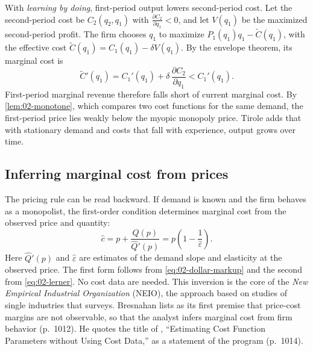 With \emph{learning by doing}, first-period output lowers second-period cost. Let the second-period cost be
$C_2(q_2, q_1)$ with $\frac{\partial C_2}{\partial q_1} < 0$, and let $V(q_1)$ be the maximized second-period profit.
The firm chooses $q_1$ to maximize $P_1(q_1)q_1 - \tilde C(q_1)$, with the effective cost $\tilde C(q_1) = C_1(q_1) -
\delta V(q_1)$. By the envelope theorem, its marginal cost is
\[
  \tilde C'(q_1) = C_1'(q_1) + \delta\,\frac{\partial C_2}{\partial q_1} < C_1'(q_1) .
\]
First-period marginal revenue therefore falls short of current marginal cost. By \cref{lem:02-monotone}, which
compares two cost functions for the same demand, the first-period price lies weakly below the myopic monopoly price.
Tirole adds that with stationary demand and costs that fall with experience, output grows over time.

\subsection{Inferring marginal cost from prices}\label{sec:02-infer-mc}

The pricing rule can be read backward. If demand is known and the firm behaves as a monopolist, the first-order
condition determines marginal cost from the observed price and quantity:
\begin{equation}\label{eq:02-infer-mc}
  \hat c = p + \frac{Q(p)}{\hat Q'(p)} = p\left(1 - \frac{1}{\hat\varepsilon}\right) .
\end{equation}
Here $\hat Q'(p)$ and $\hat\varepsilon$ are estimates of the demand slope and elasticity at the observed price. The
first form follows from \eqref{eq:02-dollar-markup} and the second from \eqref{eq:02-lerner}. No cost data are
needed. This inversion is the core of the \emph{New Empirical Industrial Organization} (NEIO), the approach based on
studies of single industries that \citet{Bresnahan1989} surveys. Bresnahan lists as its first premise that
price-cost margins are not observable, so that the analyst infers marginal cost from firm behavior (p.~1012). He
quotes the title of \citet{Rosse1970}, ``Estimating Cost Function Parameters without Using Cost Data,'' as a
statement of the program (p.~1014).

